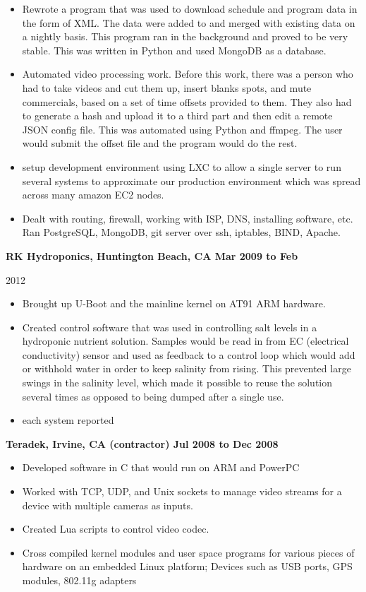 \documentclass{res}
\begin{document}
\begin{resume}
\begin{itemize}
\item Rewrote a program that was used to download schedule and program
data in the form of XML.  The data were added to and merged with existing
data on a nightly basis.  This program ran in the background and proved
to be very stable.  This was written in Python and used MongoDB as
a database.

\item Automated video processing work.  Before this work, there was a
person who had to take videos and cut them up, insert blanks spots, and
mute commercials, based on a set of time offsets provided to them.  They
also had to generate a hash and upload it to a third part and then edit
a remote JSON config file.  This was automated using Python and ffmpeg.
The user would submit the offset file and the program would do the rest.

\item setup  development  environment using LXC to allow a single server
to run several systems to approximate our production environment which
was spread across many amazon EC2 nodes.

\item Dealt with routing, firewall, working with ISP, DNS,
installing software, etc.  Ran PostgreSQL, MongoDB, git server
over ssh, iptables, BIND, Apache. 

\end{itemize}


{\large \bf RK Hydroponics, Huntington Beach, CA \hfill Mar 2009 to Feb

2012} \begin{itemize}

\item Brought up U-Boot and the mainline kernel on AT91 ARM hardware.

\item Created control software that was used in controlling salt levels
in a hydroponic nutrient solution.  Samples would be read in from EC
(electrical conductivity) sensor and used as feedback to a control loop
which would add or withhold water in order to keep salinity from rising.
This prevented large swings in the salinity level, which made it possible
to reuse the solution several times as opposed to being dumped after a
single use.

\item each system reported 
\end{itemize}

{\large \bf Teradek, Irvine, CA (contractor) \hfill Jul 2008 to Dec 2008}
\begin{itemize}
\item Developed software in C that would run on ARM and PowerPC
\item Worked with TCP, UDP, and Unix sockets to manage video streams for
a device with multiple cameras as inputs.
\item Created Lua scripts to control video codec.
\item Cross compiled kernel modules and user space programs for various
pieces of hardware on an embedded Linux platform; Devices such as USB
ports, GPS modules, 802.11g adapters
\end{itemize}


\end{resume}
\end{document}
